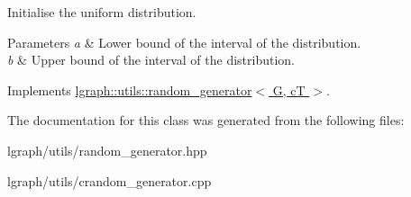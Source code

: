 Initialise the uniform distribution. 


\begin{DoxyParams}{Parameters}
{\em a} & Lower bound of the interval of the distribution. \\
\hline
{\em b} & Upper bound of the interval of the distribution. \\
\hline
\end{DoxyParams}


Implements \hyperlink{classlgraph_1_1utils_1_1random__generator_a129da597bed5b08e9c7e5a3ddce4287c}{lgraph\+::utils\+::random\+\_\+generator$<$ G, c\+T $>$}.



The documentation for this class was generated from the following files\+:\begin{DoxyCompactItemize}
\item 
lgraph/utils/random\+\_\+generator.\+hpp\item 
lgraph/utils/crandom\+\_\+generator.\+cpp\end{DoxyCompactItemize}
